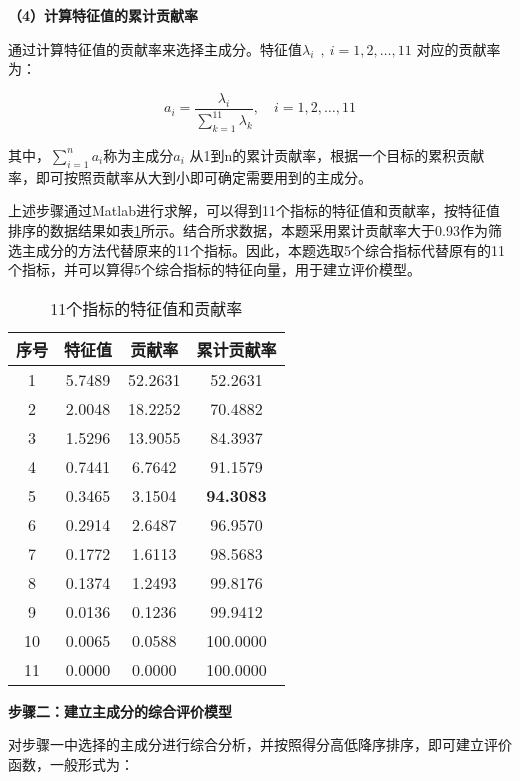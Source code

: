 \documentclass[withoutpreface,bwprint]{cumcmthesis} %
\begin{document}
\begin{spacing}{1.8}\textbf{（4）计算特征值的累计贡献率}\end{spacing}
通过计算特征值的贡献率来选择主成分。特征值$\lambda_i\ \ ,\ i=1,2,\ldots,11$ 对应的贡献率为：

\begin{equation}
    a_{i}=\frac{\lambda_{i}}{\sum_{k=1}^{11} \lambda_{k}}, \quad i=1,2, \ldots, 11
\end{equation}

其中，$\sum_{i=1}^{n}a_i $称为主成分$a_i$ 从1到n的累计贡献率，根据一个目标的累积贡献率，即可按照贡献率从大到小即可确定需要用到的主成分。

上述步骤通过Matlab进行求解，可以得到11个指标的特征值和贡献率，按特征值排序的数据结果如表\ref{tab005}所示。结合所求数据，本题采用累计贡献率大于0.93作为筛选主成分的方法代替原来的11个指标。因此，本题选取5个综合指标代替原有的11个指标，并可以算得5个综合指标的特征向量，用于建立评价模型。

\begin{table}[h]
    \caption{11个指标的特征值和贡献率}\label{tab005} \centering
    \centering
    \begin{tabular}{|c|c|c|c|}
    \hline
    序号 & 特征值 & 贡献率 & 累计贡献率 \\ \hline
    1 & 5.7489 & 52.2631 & 52.2631 \\ \hline
    2 & 2.0048 & 18.2252 & 70.4882 \\ \hline
    3 & 1.5296 & 13.9055 & 84.3937 \\ \hline
    4 & 0.7441 & 6.7642 & 91.1579 \\ \hline
    5 & 0.3465 & 3.1504 & \textbf{94.3083} \\ \hline
    6 & 0.2914 & 2.6487 & 96.9570 \\ \hline
    7 & 0.1772 & 1.6113 & 98.5683 \\ \hline
    8 & 0.1374 & 1.2493 & 99.8176 \\ \hline
    9 & 0.0136 & 0.1236 & 99.9412 \\ \hline
    10 & 0.0065 & 0.0588 & 100.0000 \\ \hline
    11 & 0.0000 & 0.0000 & 100.0000 \\ \hline
    \end{tabular}
\end{table}

\noindent\textbf{步骤二：建立主成分的综合评价模型}

对步骤一中选择的主成分进行综合分析，并按照得分高低降序排序，即可建立评价函数，一般形式为：
\end{document}
